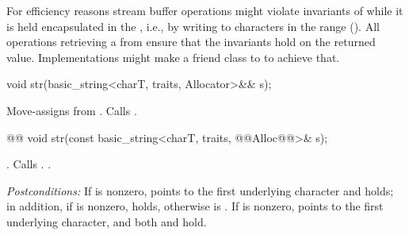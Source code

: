 \documentclass[ebook,11pt,article]{memoir}
\begin{document}
\begin{insrt}
\begin{itemdescr}
\pnum
\begin{note}
For efficiency reasons stream buffer operations might violate invariants of  while it is held encapsulated in the , i.e., by writing to characters in the range (). All operations retrieving a  from  ensure that the  invariants hold on the returned value. Implementations might make  a friend class to  to achieve that.
\end{note}
\end{itemdescr}

\begin{itemdecl}
void str(basic_string<charT, traits, Allocator>&& s);
\end{itemdecl}
\begin{itemdescr}
\pnum
\effects 
Move-assigns  from . Calls .
\end{itemdescr}
\end{insrt}

\begin{itemdecl}
@@
void str(const basic_string<charT, traits, @@Alloc@@>& s);
\end{itemdecl}

\begin{itemdescr}
\pnum
\effects
{}. Calls .
.

\begin{removedblock}
\pnum
\emph{Postconditions:} %
If  is nonzero,  points to the
first underlying character and   holds; in
addition, if  is nonzero,
holds, otherwise  is . If  is
nonzero,  points to the first underlying character, and both  and  hold.
\end{removedblock}
\end{itemdescr}
\end{document}
